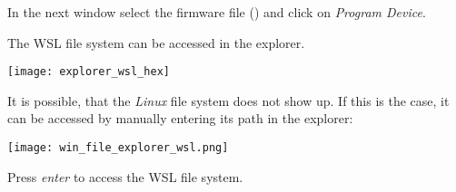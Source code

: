 \begin{center}
\end{center}

In the next window select the firmware file () and click on \emph{Program Device}.

\begin{infobox}
  The WSL file system can be accessed in the explorer.
  \begin{center}
    \texttt{[image: explorer\_wsl\_hex]}
  \end{center}

  It is possible, that the \emph{Linux} file system does not show up.
  If this is the case, it can be accessed by manually entering its path in the explorer:
  \mono{\\\\wsl\$}
  \begin{center}
    \texttt{[image: win\_file\_explorer\_wsl.png]}
  \end{center}
  Press \emph{enter} to access the WSL file system.
\end{infobox}
